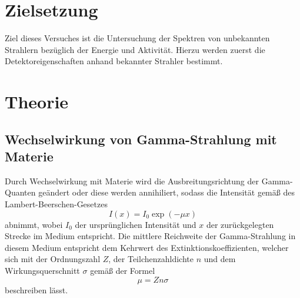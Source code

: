 



\maketitle
\section{Zielsetzung}
Ziel dieses Versuches ist die Untersuchung der Spektren von unbekannten Strahlern bezüglich der Energie und Aktivität.
Hierzu werden zuerst die Detektoreigenschaften anhand bekannter Strahler bestimmt. 

\section{Theorie}
\subsection{Wechselwirkung von Gamma-Strahlung mit Materie}
Durch Wechselwirkung mit Materie wird die Ausbreitungsrichtung der Gamma-Quanten geändert oder diese werden annihiliert, sodass die Intensität gemäß des Lambert-Beerschen-Gesetzes
\begin{equation}
I(x) = I_0 \exp(-\mu x)
\end{equation}
abnimmt,
wobei $I_0$ der ursprünglichen Intensität und $x$ der zurückgelegten Strecke im Medium entspricht.
Die mittlere Reichweite der Gamma-Strahlung in diesem Medium entspricht dem Kehrwert des Extinktionskoeffizienten, welcher sich mit der Ordnungszahl $Z$, der Teilchenzahldichte $n$ und dem Wirkungsquerschnitt $\sigma$ gemäß der Formel
\begin{equation}\label{eq:mu}
\mu = Zn\sigma
\end{equation}
beschreiben lässt.

